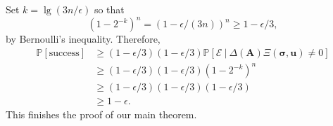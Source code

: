 \documentclass[a4paper]{article}
\def\mA{{\bm A}}
\def\ub{{\bm u}}
\def\pr{\mathbb{P}}
\begin{document}
Set $k = \lg(3n/\epsilon)$ so that 
\[
(1-2^{-k})^n = (1 - \epsilon/(3n))^n \geq 1 - \epsilon/3,
\]
by Bernoulli's inequality. Therefore, 
\begin{align*}
\pr[\textrm{success}] &\geq (1- \epsilon/3)(1-
\epsilon/3)\pr[\mathscr{E}~|~   \Delta(\mA)\Xi(\bm \sigma,\ub) \ne 0]\\ 
& \geq (1- \epsilon/3)(1-
\epsilon/3)(1-2^{-k})^n \\ & \geq (1- \epsilon/3)(1- \epsilon/3)(1-
\epsilon/3)\\ & \geq 1 - \epsilon.
\end{align*}
This finishes the proof of our main theorem.








\end{document}
